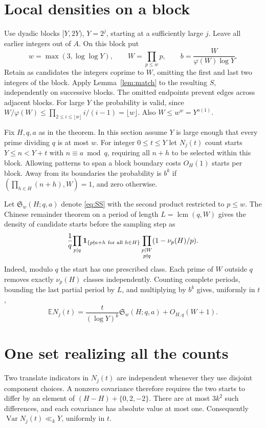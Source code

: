 \documentclass[11pt]{article}
\newcommand{\SSer}{\mathfrak S}
\newcommand{\EE}{\mathbb E}
\newcommand{\one}{\mathbf 1}
\begin{document}
\section{Local densities on a block}
Use dyadic blocks $[Y,2Y)$, $Y=2^j$, starting at a sufficiently large
$j$. Leave all earlier integers out of $A$. On this block put
\[
 w=\max(3,\log\log Y),\qquad W=\prod_{p\le w}p,\qquad
 b=\frac{W}{\varphi(W)\log Y}.
\]
Retain as candidates the integers coprime to $W$, omitting the first
and last two integers of the block. Apply Lemma~\ref{lem:match} to
the resulting $S$, independently on successive blocks. The omitted
endpoints prevent edges across adjacent blocks. For large $Y$ the
probability is valid, since
$W/\varphi(W)\le\prod_{2\le i\le\lfloor w\rfloor}i/(i-1)
=\lfloor w\rfloor$. Also $W\le w^w=Y^{o(1)}$.

Fix $H,q,a$ as in the theorem. In this section assume $Y$ is large
enough that every prime dividing $q$ is at most $w$. For integer
$0\le t\le Y$ let $N_j(t)$ count starts $Y\le n<Y+t$ with
$n\equiv a\bmod q$, requiring all $n+h$ to be selected within this
block. Allowing patterns to span a block boundary costs
$O_H(1)$ starts per block. Away from its boundaries the probability
is $b^k$ if $(\prod_{h\in H}(n+h),W)=1$, and zero otherwise.

Let $\SSer_w(H;q,a)$ denote \eqref{eq:SS} with the second product
restricted to $p\le w$. The Chinese remainder theorem on a period of
length $L=\operatorname{lcm}(q,W)$ gives the density of candidate
starts before the sampling step as
\[
 {1\over q}\!
 \prod_{p\mid q}\one_{\{p\nmid a+h\ \text{for all }h\in H\}}
 \prod_{\substack{p\mid W\\p\nmid q}}(1-\nu_p(H)/p).
\]
Indeed, modulo $q$ the start has one prescribed class. Each prime of
$W$ outside $q$ removes exactly $\nu_p(H)$ classes independently.
Counting complete periods, bounding the last partial period by $L$,
and multiplying by $b^k$ gives, uniformly in $t$,
\begin{equation}
 \EE N_j(t)=\frac{t}{(\log Y)^k}\SSer_w(H;q,a)+O_{H,q}(W+1).
 \label{eq:expect}
\end{equation}

\section{One set realizing all the counts}
Two translate indicators in $N_j(t)$ are independent whenever they
use disjoint component choices. A nonzero covariance therefore
requires the two starts to differ by an element of
$(H-H)+\{0,2,-2\}$. There are at most $3k^2$ such differences, and
each covariance has absolute value at most one. Consequently
$\operatorname{Var}N_j(t)\ll_k Y$, uniformly in $t$.
\end{document}
